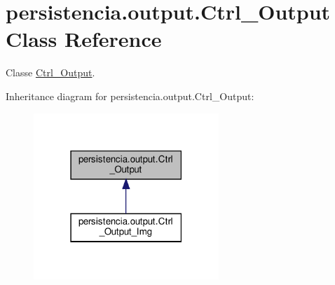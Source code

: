 \hypertarget{classpersistencia_1_1output_1_1Ctrl__Output}{}\section{persistencia.\+output.\+Ctrl\+\_\+\+Output Class Reference}
\label{classpersistencia_1_1output_1_1Ctrl__Output}


Classe \hyperlink{classpersistencia_1_1output_1_1Ctrl__Output}{Ctrl\+\_\+\+Output}.  




Inheritance diagram for persistencia.\+output.\+Ctrl\+\_\+\+Output\+:\nopagebreak
\begin{figure}[H]
\begin{center}
\leavevmode
\includegraphics[width=198pt]{classpersistencia_1_1output_1_1Ctrl__Output__inherit__graph}
\end{center}
\end{figure}
